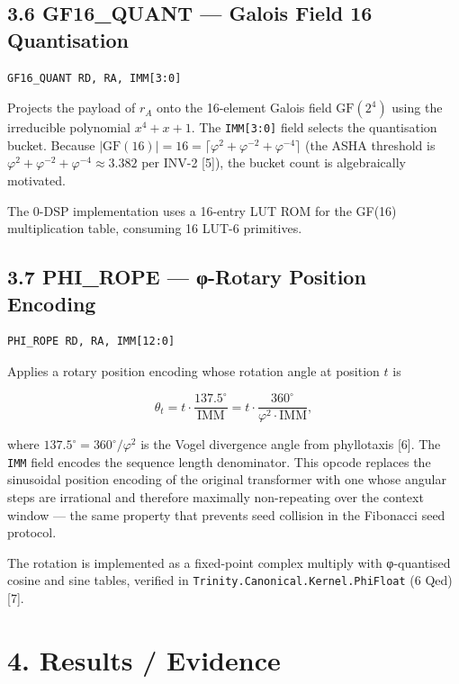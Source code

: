 \subsection{3.6 GF16\_QUANT --- Galois Field 16
Quantisation}\label{fa_26:gf16_quant-galois-field-16-quantisation}

\begin{verbatim}
GF16_QUANT RD, RA, IMM[3:0]
\end{verbatim}

Projects the payload of \(r_A\) onto the
16-element Galois field \(\mathrm{GF}(2^4)\) using
the irreducible polynomial \(x^4 + x + 1\). The
\texttt{IMM{[}3:0{]}} field selects the
quantisation bucket. Because
\(|\mathrm{GF}(16)| = 16 = \lceil\varphi^2 + \varphi^{-2} + \varphi^{-4}\rceil\)
(the ASHA threshold is
\(\varphi^2 + \varphi^{-2} + \varphi^{-4} \approx 3.382\)
per INV-2 [5]), the bucket count is
algebraically motivated.

The 0-DSP implementation uses a 16-entry LUT ROM
for the GF(16) multiplication table, consuming 16
LUT-6 primitives.

\subsection{3.7 PHI\_ROPE --- φ-Rotary Position
Encoding}\label{fa_26:phi_rope-ux3c6-rotary-position-encoding}

\begin{verbatim}
PHI_ROPE RD, RA, IMM[12:0]
\end{verbatim}

Applies a rotary position encoding whose rotation
angle at position \(t\) is

\[\theta_t = t \cdot \frac{137.5^\circ}{\text{IMM}} = t \cdot \frac{360^\circ}{\varphi^2 \cdot \text{IMM}},\]

where \(137.5^\circ = 360^\circ/\varphi^2\) is the Vogel
divergence angle from phyllotaxis [6]. The
\texttt{IMM} field encodes the sequence length
denominator. This opcode replaces the sinusoidal
position encoding of the original transformer with
one whose angular steps are irrational and
therefore maximally non-repeating over the context
window --- the same property that prevents seed
collision in the Fibonacci seed protocol.

The rotation is implemented as a fixed-point
complex multiply with φ-quantised cosine and sine
tables, verified in
\texttt{Trinity.Canonical.Kernel.PhiFloat} (6 Qed)
[7].

\section{4. Results /
Evidence}\label{fa_26:results-evidence}

